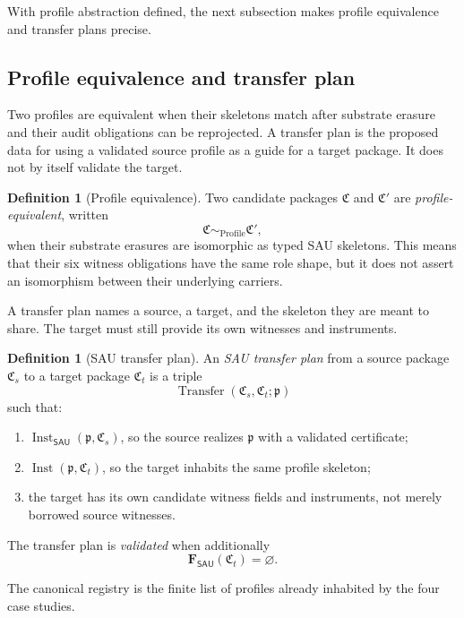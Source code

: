 \documentclass[11pt]{article}
\newcommand{\SAU}{\mathsf{SAU}}
\newcommand{\Prof}{\operatorname{Profile}}
\newcommand{\Inst}{\operatorname{Inst}}
\newcommand{\Transfer}{\operatorname{Transfer}}
\theoremstyle{definition}
\newtheorem{definition}[theorem]{Definition}
\begin{document}
With profile abstraction defined, the next subsection makes profile equivalence
and transfer plans precise.

\subsection{Profile equivalence and transfer plan}
\label{subsec:transfer-equivalence-plan}

Two profiles are equivalent when their skeletons match after substrate erasure
and their audit obligations can be reprojected.  A transfer plan is the proposed
data for using a validated source profile as a guide for a target package.  It
does not by itself validate the target.

\begin{definition}[Profile equivalence]
\label{def:sau-profile-equivalence}
Two candidate packages \(\mathfrak C\) and \(\mathfrak C'\) are \emph{profile-equivalent}, written
\[
\mathfrak C\sim_{\Prof}\mathfrak C',
\]
when their substrate erasures are isomorphic as typed SAU skeletons.  This means that their six witness obligations have the same role shape, but it does not assert an isomorphism between their underlying carriers.
\end{definition}

A transfer plan names a source, a target, and the skeleton they are meant to
share.  The target must still provide its own witnesses and instruments.

\begin{definition}[SAU transfer plan]
\label{def:sau-transfer-plan}
An \emph{SAU transfer plan} from a source package \(\mathfrak C_s\) to a target package \(\mathfrak C_t\) is a triple
\[
\Transfer(\mathfrak C_s,\mathfrak C_t;\mathfrak p)
\]
such that:
\begin{enumerate}
\item \(\Inst_{\SAU}(\mathfrak p,\mathfrak C_s)\), so the source realizes \(\mathfrak p\) with a validated certificate;
\item \(\Inst(\mathfrak p,\mathfrak C_t)\), so the target inhabits the same profile skeleton;
\item the target has its own candidate witness fields and instruments, not merely borrowed source witnesses.
\end{enumerate}
The transfer plan is \emph{validated} when additionally
\[
\mathbf F_{\SAU}(\mathfrak C_t)=\varnothing.
\]
\end{definition}

The canonical registry is the finite list of profiles already inhabited by the
four case studies.
\end{document}
